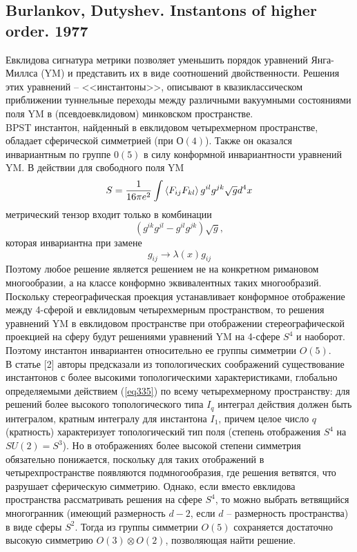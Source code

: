 \documentclass[12pt]{article}
\theoremstyle{definition}
\begin{document}
\subsection{Burlankov, Dutyshev. Instantons of higher order. 1977}
Евклидова сигнатура метрики позволяет уменьшить порядок уравнений Янга-Миллса (YM) и представить их в виде соотношений двойственности. Решения этих уравнений -- <<инстантоны>>, описывают в квазиклассическом приближении туннельные переходы между различными вакуумными состояниями поля YM в  (псевдоевклидовом) минковском пространстве.\\
BPST инстантон, найденный в евклидовом четырехмерном пространстве, обладает сферической симметрией (при $О(4)$). Также он оказался инвариантным по группе $0(5)$ в силу конформной инвариантности уравнений YM. В действии для свободного поля YM
\begin{equation}\label{eq335}
    S=\frac{1}{16\pi e^2}\int\braket{F_{ij}F_{kl}}g^{il}g^{jk}\sqrt{g}d^4x
\end{equation}
метрический тензор входит только в комбинации
\begin{equation}
    (g^{ik}g^{jl}-g^{il}g^{jk})\sqrt{g},
\end{equation}
которая инвариантна при замене
\begin{equation}
    g_{ij}\rightarrow\lambda(x)g_{ij}
\end{equation}
Поэтому любое решение является решением не на конкретном римановом многообразии, а на классе конформно эквивалентных таких многообразий. Поскольку стереографическая проекция устанавливает конформное отображение между 4-сферой и евклидовым четырехмерным пространством, то решения уравнений YM в евклидовом пространстве при отображении стереографической проекцией на сферу будут решениями уравнений YM на 4-сфере $S^4$ и наоборот. Поэтому инстантон инвариантен относительно ее группы симметрии $O(5)$.\\
В статье [2] авторы предсказали из топологических соображений существование инстантонов с более высокими топологическими характеристиками, глобально определяемыми действием (\ref{eq335}) по всему четырехмерному пространству: для решений более высокого топологического типа $I_q$ интеграл действия должен быть интегралом, кратным интегралу для инстантона $I_1$, причем целое число $q$ (кратность) характеризует топологический тип поля (степень отображения $S^4$ на $SU(2)=S^3$). Но в отображениях более высокой степени симметрия обязательно понижается, поскольку для таких отображений в четырехпространстве появляются подмногообразия, где решения ветвятся, что разрушает сферическую симметрию. Однако, если вместо евклидова пространства рассматривать решения на сфере $S^4$, то можно выбрать ветвящийся многогранник (имеющий размерность $d-2$, если $d$ -- размерность пространства) в виде сферы $S^2$. Тогда из группы симметрии $O(5)$ сохраняется достаточно высокую симметрию $O(3)\otimes O(2)$, позволяющая найти решение.\\
\end{document}
